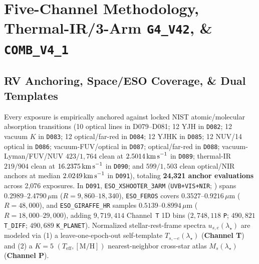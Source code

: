 \documentclass[twocolumn,10pt]{article}
\begin{document}
\section{Five-Channel Methodology, Thermal-IR/3-Arm \texttt{G4\_V42}, \& \texttt{COMB\_V4\_1}}
\subsection{RV Anchoring, Space/ESO Coverage, \& Dual Templates}
Every exposure is empirically anchored against locked NIST atomic/molecular absorption transitions (10 optical lines in D079--D081; 12 YJH in \texttt{D082}; 12 vacuum $K$ in \texttt{D083}; 12 optical/far-red in \texttt{D084}; 12 YJHK in \texttt{D085}; 12 NUV/14 optical in \texttt{D086}; vacuum-FUV/optical in \texttt{D087}; optical/far-red in \texttt{D088}; vacuum-Lyman/FUV/NUV $423/1{,}764$ clean at $2.5014\,\text{km\,s}^{-1}$ in \texttt{D089}; thermal-IR $219/904$ clean at $16.2375\,\text{km\,s}^{-1}$ in \texttt{D090}; and $599/1{,}503$ clean optical/NIR anchors at median $2.0249\,\text{km\,s}^{-1}$ in \texttt{D091}), totaling \textbf{24,321 anchor evaluations} across 2,076 exposures. In \texttt{D091}, \texttt{ESO\_XSHOOTER\_3ARM} (\texttt{UVB+VIS+NIR}; \cite{Vernet2011}) spans $0.2989\text{--}2.4790\,\mu\text{m}$ ($R=9{,}860\text{--}18{,}340$), \texttt{ESO\_FEROS} \cite{Kaufer1999} covers $0.3527\text{--}0.9216\,\mu\text{m}$ ($R=48{,}000$), and \texttt{ESO\_GIRAFFE\_HR} \cite{Pasquini2002} samples $0.5139\text{--}0.8994\,\mu\text{m}$ ($R=18{,}000\text{--}29{,}000$), adding $9{,}719{,}414$ Channel~\texttt{T} 1D bins ($2{,}748{,}118$ \texttt{P}; $490{,}821$ \texttt{T\_DIFF}; $490{,}689$ \texttt{K\_PLANET}). Normalized stellar-rest-frame spectra $u_{s,e}(\lambda_{\star})$ are modeled via (1) a leave-one-epoch-out self-template $T_{s,-e}(\lambda_{\star})$ (\textbf{Channel T}) and (2) a $K=5$ $(T_{\mathrm{eff}}, [\mathrm{M/H}])$ nearest-neighbor cross-star atlas $M_s(\lambda_{\star})$ (\textbf{Channel P}).
\end{document}
